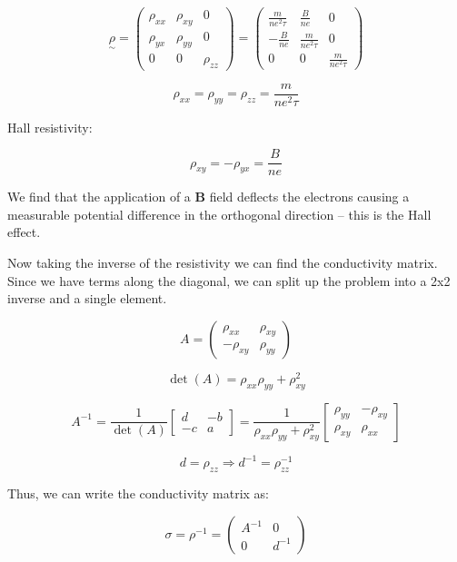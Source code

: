 \begin{enumerate}[label=(\alph*)]
\[ \underset{\sim}{\rho} = \begin{pmatrix}
    \rho_{xx} & \rho_{xy} & 0 \\
    \rho_{yx} & \rho_{yy} & 0 \\
    0 & 0 & \rho_{zz}
    \end{pmatrix} = \begin{pmatrix}
        \frac{m}{ne^2 \tau} & \frac{B}{ne} & 0 \\
        -\frac{B}{ne} & \frac{m}{ne^2 \tau} & 0 \\
        0 & 0 & \frac{m}{ne^2 \tau}
    \end{pmatrix}
 \]

\[ \rho_{xx} = \rho_{yy} = \rho_{zz} = \frac{m}{ne^2 \tau} \]

Hall resistivity:

\[ \boxed{\rho_{xy} = -\rho_{yx} = \frac{B}{ne} }\]

We find that the application of a $\mathbf{B}$ field deflects the electrons causing a measurable potential difference in the orthogonal direction -- this is the Hall effect.

Now taking the inverse of the resistivity we can find the conductivity matrix. Since we have terms along the diagonal, we can split up the problem into a 2x2 inverse and a single element.

\[ A = \begin{pmatrix}
    \rho_{xx} & \rho_{xy} \\ -\rho_{xy} & \rho_{yy}
\end{pmatrix} \]

\[ \det(A) = \rho_{xx} \rho_{yy} + \rho_{xy}^2 \]

\[ A^{-1} = \frac{1}{\det(A)} \begin{bmatrix}
    d & -b \\ -c & a
\end{bmatrix} = \frac{1}{\rho_{xx} \rho_{yy} + \rho_{xy}^2} \begin{bmatrix}
    \rho_{yy} & -\rho_{xy} \\ \rho_{xy} & \rho_{xx}
\end{bmatrix}\]

\[ d = \rho_{zz} \Rightarrow d^{-1} = \rho_{zz}^{-1}\]

Thus, we can write the conductivity matrix as:

\[ \sigma = \rho^{-1} = \begin{pmatrix}
    A^{-1} & 0 \\ 0 & d^{-1}
\end{pmatrix} \]


\end{enumerate}
